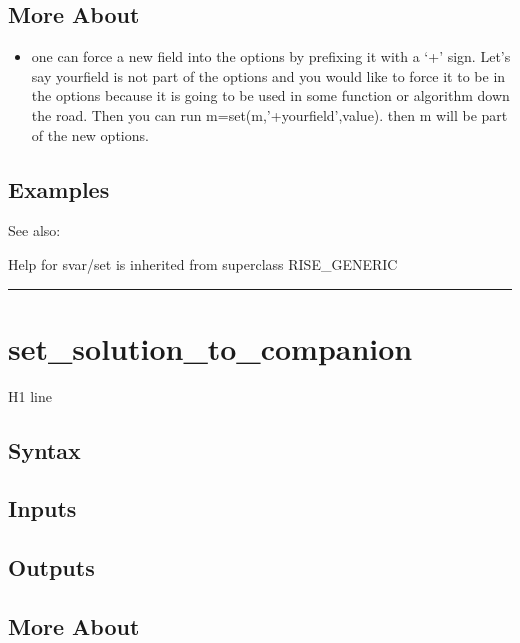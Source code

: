 \documentclass[letterpaper,10pt,english]{sphinxmanual}
\begin{document}
\subsection{More About}
\label{classes/models/@svar/svar:id124}\begin{itemize}
\item {} 
one can force a new field into the options by prefixing it with a `+'
sign. Let's say yourfield is not part of the options and you would like
to force it to be in the options because it is going to be used in some
function or algorithm down the road. Then you can run
m=set(m,'+yourfield',value). then m will be part of the new options.

\end{itemize}


\subsection{Examples}
\label{classes/models/@svar/svar:id125}
See also:

Help for svar/set is inherited from superclass RISE\_GENERIC


\bigskip\hrule{}\bigskip



\section{set\_solution\_to\_companion}
\label{classes/models/@svar/svar:id126}\label{classes/models/@svar/svar:set-solution-to-companion}
H1 line


\subsection{Syntax}
\label{classes/models/@svar/svar:id127}

\subsection{Inputs}
\label{classes/models/@svar/svar:id128}

\subsection{Outputs}
\label{classes/models/@svar/svar:id129}

\subsection{More About}
\label{classes/models/@svar/svar:id130}
\end{document}
